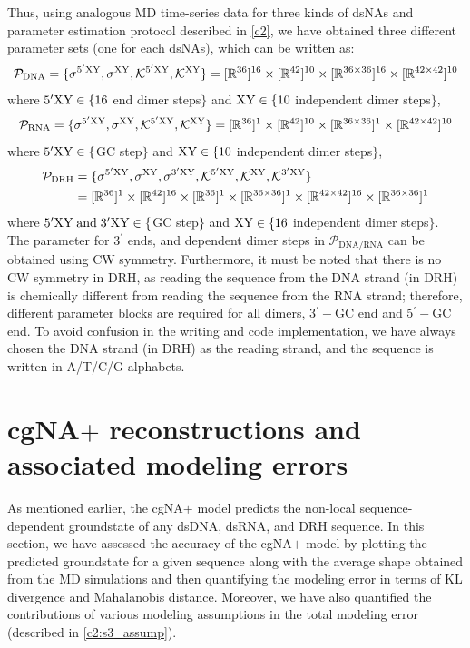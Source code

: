 Thus, using analogous MD time-series data for three kinds of dsNAs and parameter estimation protocol described in \cref{c2}, we have obtained three different parameter sets (one for each dsNAs), which can be written as:
\begin{equation}
\mathcal{P}_{\text{DNA}} = \{ \sigma^{5^\prime{\text{XY}}},  \sigma^{{\text{XY}}}, {\mathcal K}^{5^\prime{\text{XY}}}, {\mathcal K}^{{\text{XY}}} \} = [{\mathbb R}^{36}]^{16} \times [{\mathbb R}^{42}]^{10} \times [{\mathbb R}^{36 \times 36}]^{16} \times [{\mathbb R}^{42 \times 42}]^{10}
\label{c4:eq2_DNA}
\end{equation}
where $5^\prime{\text{XY}} \in\{16$ end dimer steps$\}$  and
${\text{XY}} \in\{10$ independent dimer steps$\}$,
\begin{equation}
\mathcal{P}_{\text{RNA}} = \{ \sigma^{5^\prime{\text{XY}}},  \sigma^{{\text{XY}}}, {\mathcal K}^{5^\prime{\text{XY}}}, {\mathcal K}^{{\text{XY}}} \}  = [{\mathbb R}^{36}]^{1} \times [{\mathbb R}^{42}]^{10} \times [{\mathbb R}^{36 \times 36}]^{1} \times [{\mathbb R}^{42 \times 42}]^{10}
\label{c4:eq2_RNA}
\end{equation}
where $5^\prime{\text{XY}} \in\{$GC step$\}$  and
${\text{XY}} \in\{10$ independent dimer steps$\}$, 
\begin{equation}
\begin{split}
\mathcal{P}_{\text{DRH}} & =  \{ \sigma^{5^\prime{\text{XY}}},  \sigma^{{\text{XY}}}, \sigma^{3^\prime{\text{XY}}}, {\mathcal K}^{5^\prime{\text{XY}}}, {\mathcal K}^{{\text{XY}}}, {\mathcal K}^{3^\prime{\text{XY}}} \}  \\ 
 & =  [{\mathbb R}^{36}]^{1} \times [{\mathbb R}^{42}]^{16} \times [{\mathbb R}^{36}]^{1} \times [{\mathbb R}^{36 \times 36}]^{1} \times [{\mathbb R}^{42 \times 42}]^{16} \times [{\mathbb R}^{36 \times 36}]^{1}
\end{split}
\label{c4:eq2_DRH}
\end{equation}
where $5^\prime{\text{XY}} {\;\text{and\;}} 3^\prime{\text{XY}} \in\{$GC step$\}$  and
${\text{XY}} \in\{16$ independent dimer steps$\}$. 
The parameter for $3^\prime$ ends, and dependent dimer steps in $\mathcal{P}_{\text{DNA/RNA}}$ can be obtained using CW symmetry.
Furthermore, it must be noted that there is no CW symmetry in DRH, as reading the sequence from the DNA strand (in DRH) is chemically different from reading the sequence from the RNA strand; therefore, different parameter blocks are required for all dimers,  3$^\prime-$GC end and 5$^\prime-$GC end.
To avoid confusion in the writing and code implementation, we have always chosen the DNA strand (in DRH) as the reading strand, and the sequence is written in A/T/C/G alphabets.

\section{cgNA$+$ reconstructions and associated modeling errors}\label{c4:s3}
As mentioned earlier, the cgNA$+$ model predicts the non-local sequence-dependent groundstate of any dsDNA, dsRNA, and DRH sequence.
In this section, we have assessed the accuracy of the cgNA$+$ model by plotting the predicted groundstate for a given sequence along with the average shape obtained from the MD simulations and then quantifying the modeling error in terms of KL divergence and Mahalanobis distance.
Moreover, we have also quantified the contributions of various modeling assumptions in the total modeling error (described in \cref{c2:s3_assump}).
